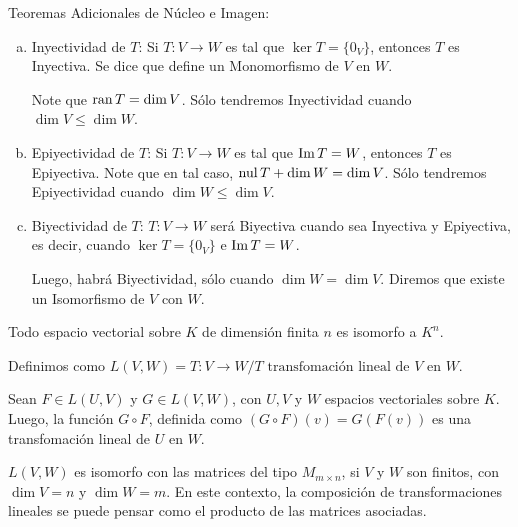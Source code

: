 Teoremas Adicionales de Núcleo e Imagen:
\begin{enumerate}[(a)]
    \item Inyectividad de $T$: Si $T:V \to W$ es tal que $\ker T = \{0_V\}$, entonces $T$ es Inyectiva. Se dice que define un Monomorfismo de $V$ en $W$.

Note que $\operatorname{ran} T = \dim V$. Sólo tendremos Inyectividad cuando $\dim V \leq \dim W$.
\item Epiyectividad de $T$: Si $T:V\to W$ es tal que $\operatorname{Im} T = W$, entonces $T$ es Epiyectiva. Note
que en tal caso, $\operatorname{nul} T + \dim W = \dim V$. Sólo tendremos Epiyectividad cuando $\dim W \leq \dim V$.

\item Biyectividad de $T$: $T:V \to W$ será Biyectiva cuando sea Inyectiva y Epiyectiva, es decir, cuando $\ker T = \{0_V\}$ e $\operatorname{Im} T  = W$.

Luego, habrá Biyectividad, sólo cuando $\dim W = \dim V$. Diremos que existe un Isomorfismo de $V$ con $W$.



\end{enumerate}

\begin{thm}
Todo espacio vectorial sobre $K$ de dimensión finita $n$ es isomorfo a $K^n$.
\end{thm}

 Definimos como $L(V,W) = {T:V\to W/ T \text{ transfomaci\'on lineal de } V \text{ en } W}$. 
\begin{thm}
Sean $F\in L(U,V)$ y $G\in L(V,W)$, con $U,V$ y $W$ espacios vectoriales sobre $K$.
Luego, la función $G\circ F$, definida como $(G\circ F)(v) = G(F(v))$ es una transfomaci\'on lineal de $U$ en $W$.
\end{thm}


\begin{thm}
$L(V,W)$ es isomorfo con las matrices del tipo $M_{m\times n}$, si $V$ y $W$ son finitos, con $\dim V = n$ y $\dim W = m$.
En este contexto, la composici\'on de transformaciones lineales se puede pensar como el producto de las matrices asociadas.
\end{thm}


